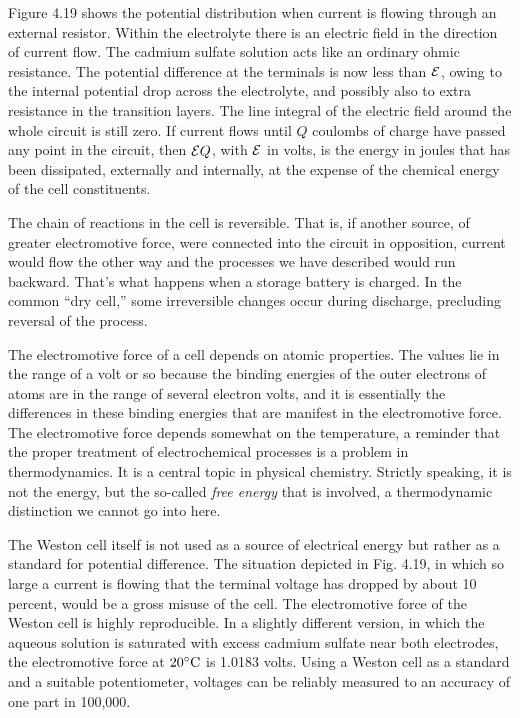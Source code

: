 Figure 4.19 shows the potential distribution when current is 
flowing through an external resistor. Within the electrolyte there is an
electric field in the direction of current flow. The cadmium sulfate
solution acts like an ordinary ohmic resistance. The potential difference
at the terminals is now less than $\mathcal{E}$, owing to the internal potential
drop across the electrolyte, and possibly also to extra resistance
in the transition layers. The line integral of the electric field
around the whole circuit is still zero. If current flows until $Q$ coulombs
of charge have passed any point in the circuit, then $\mathcal{E} Q$, with
$\mathcal{E}$ in volts, is the energy in joules that has been dissipated, externally
and internally, at the expense of the chemical energy of the cell
constituents.

The chain of reactions in the cell is reversible. That is, if another
source, of greater electromotive force, were connected into the circuit
in opposition, current would flow the other way and the processes
we have described would run backward. That's what happens when
a storage battery is charged. In the common ``dry cell,'' some
irreversible changes occur during discharge, precluding reversal of
the process.

The electromotive force of a cell depends on atomic properties.
The values lie in the range of a volt or so because the binding energies
of the outer electrons of atoms are in the range of several electron
volts, and it is essentially the differences in these binding energies
that are manifest in the electromotive force. The electromotive force
depends somewhat on the temperature, a reminder that the proper
treatment of electrochemical processes is a problem in 
thermodynamics. It is a central topic in physical chemistry. Strictly speaking,
it is not the energy, but the so-called \emph{free energy} that is involved,
a thermodynamic distinction we cannot go into here.

The Weston cell itself is not used as a source of electrical energy but
rather as a standard for potential difference. The situation depicted
in Fig. 4.19, in which so large a current is flowing that the terminal
voltage has dropped by about 10 percent, would be a gross misuse of
the cell. The electromotive force of the Weston cell is highly 
reproducible. In a slightly different version, in which the aqueous solution
is saturated with excess cadmium sulfate near both electrodes, the
electromotive force at $20\mspace{0mu}^\circ\textup{C}$ is 1.0183 volts. Using a Weston cell as
a standard and a suitable potentiometer, voltages can be reliably
measured to an accuracy of one part in 100,000.

